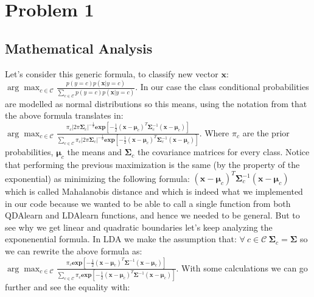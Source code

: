 \documentclass{article}
\begin{document}
\section{Problem 1}
\subsection{Mathematical Analysis}
Let's consider this generic formula, to classify new vector $\textbf{x}$:\\
$\displaystyle\arg\max_{c\in\mathcal{C}}\frac{p(y=c)p(\textbf{x}|y=c)}{\displaystyle\sum_{c\in \mathcal{C}}p(y=c)p(\textbf{x}|y=c) }$.
In our case the class conditional probabilities are modelled as normal distributions so this means, using the notation from \cite{Murphy} 
that the above formula translates in:\\
$\displaystyle\arg\max_{c\in\mathcal{C}}\frac{\pi_c|2\pi\bm{\Sigma}_c|^{-\frac{1}{2}}\textbf{exp}[-\frac{1}{2}(\textbf{x}-\bm{\mu}_c)^{T}\bm{\Sigma}^{-1}_c(\textbf{x}-\bm{\mu}_c)]}{\displaystyle\sum_{c\in\mathcal{C}}\pi_c|2\pi\bm{\Sigma}_c|^{-\frac{1}{2}}\textbf{exp}[-\frac{1}{2}(\textbf{x}-\bm{\mu}_c)^{T}\bm{\Sigma}^{-1}_c(\textbf{x}-\bm{\mu}_c)]}$. Where $\pi_c$ are the prior probabilities, $\bm{\mu}_c$ the means and $\bm{\Sigma}_c$ the covariance matrices for every class. Notice that performing the previous maximization is the same (by the property of the exponential) as minimizing
the following formula: $(\textbf{x}-\bm{\mu}_c)^{T}\bm{\Sigma}^{-1}_c(\textbf{x}-\bm{\mu}_c)$ which is called Mahalanobis distance and 
which is indeed what we implemented in our code because we wanted to be able to call a single function from both QDAlearn and LDAlearn functions, and 
hence we needed to be general.
But to see why we get linear and quadratic boundaries let's keep analyzing the exponenential formula.
In LDA we make the assumption that:  $\forall\ c\in\mathcal{C}\ \bm{\Sigma}_c=\bm{\Sigma}$ so we can rewrite the above formula as:\\
$\displaystyle\arg\max_{c\in\mathcal{C}}\frac{\pi_c\textbf{exp}[-\frac{1}{2}(\textbf{x}-\bm{\mu}_c)^{T}\bm{\Sigma}^{-1}(\textbf{x}-\bm{\mu}_c)]}{\displaystyle\sum_{c\in\mathcal{C}}\pi_c\textbf{exp}[-\frac{1}{2}(\textbf{x}-\bm{\mu}_c)^{T}\bm{\Sigma}^{-1}(\textbf{x}-\bm{\mu}_c)]}$.
With some calculations we can go further and see the equality with:
\end{document}
